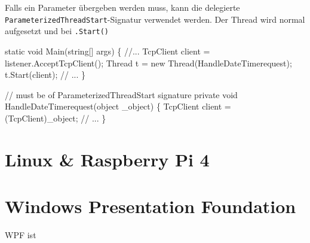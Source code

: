 \documentclass[
  10pt,
  a4paperpaper,
  DIV=11]{scrartcl}
\newenvironment{Shaded}{}{}
\newcommand{\CommentTok}[1]{\textcolor[rgb]{0.42,0.45,0.49}{#1}}
\newcommand{\DataTypeTok}[1]{\textcolor[rgb]{0.84,0.23,0.29}{#1}}
\newcommand{\FunctionTok}[1]{\textcolor[rgb]{0.44,0.26,0.76}{#1}}
\newcommand{\KeywordTok}[1]{\textcolor[rgb]{0.84,0.23,0.29}{#1}}
\newcommand{\NormalTok}[1]{\textcolor[rgb]{0.14,0.16,0.18}{#1}}
\newcommand{\OperatorTok}[1]{\textcolor[rgb]{0.14,0.16,0.18}{#1}}
\numberwithin{equation}{section}
\begin{document}
Falls ein Parameter übergeben werden muss, kann die delegierte
\texttt{ParameterizedThreadStart}-Signatur verwendet werden. Der Thread
wird normal aufgesetzt und bei \texttt{.Start()}

\begin{Shaded}
\begin{Highlighting}[]
\KeywordTok{static} \DataTypeTok{void} \FunctionTok{Main}\OperatorTok{(}\DataTypeTok{string}\OperatorTok{[]}\NormalTok{ args}\OperatorTok{)}
\OperatorTok{\{}
  \CommentTok{//...}
\NormalTok{  TcpClient client }\OperatorTok{=}\NormalTok{ listener}\OperatorTok{.}\FunctionTok{AcceptTcpClient}\OperatorTok{();}
\NormalTok{  Thread t }\OperatorTok{=} \KeywordTok{new} \FunctionTok{Thread}\OperatorTok{(}\NormalTok{HandleDateTimerequest}\OperatorTok{);}
\NormalTok{  t}\OperatorTok{.}\FunctionTok{Start}\OperatorTok{(}\NormalTok{client}\OperatorTok{);}
  \CommentTok{// ...}
\OperatorTok{\}}

\CommentTok{// must be of ParameterizedThreadStart signature}
\KeywordTok{private} \DataTypeTok{void} \FunctionTok{HandleDateTimerequest}\OperatorTok{(}\DataTypeTok{object}\NormalTok{ \_object}\OperatorTok{)}
\OperatorTok{\{}
\NormalTok{  TcpClient client }\OperatorTok{=} \OperatorTok{(}\NormalTok{TcpClient}\OperatorTok{)}\NormalTok{\_object}\OperatorTok{;}
  \CommentTok{// ...}
\OperatorTok{\}}
\end{Highlighting}
\end{Shaded}

\hypertarget{linux-raspberry-pi-4}{%
\section{Linux \& Raspberry Pi 4}\label{linux-raspberry-pi-4}}

\hypertarget{windows-presentation-foundation}{%
\section{\texorpdfstring{\textbf{W}indows \textbf{P}resentation
\textbf{F}oundation}{Windows Presentation Foundation}}\label{windows-presentation-foundation}}

\begin{tcolorbox}[enhanced jigsaw, coltitle=black, colbacktitle=quarto-callout-note-color!10!white, opacityback=0, colframe=quarto-callout-note-color-frame, arc=.35mm, breakable, toprule=.15mm, rightrule=.15mm, titlerule=0mm, bottomtitle=1mm, colback=white, toptitle=1mm, title=\textcolor{quarto-callout-note-color}{\faInfo}\hspace{0.5em}{Unterschied zwischen WPF \& Console Application}, bottomrule=.15mm, leftrule=.75mm, opacitybacktitle=0.6, left=2mm]
WPF ist
\end{tcolorbox}
\end{document}
